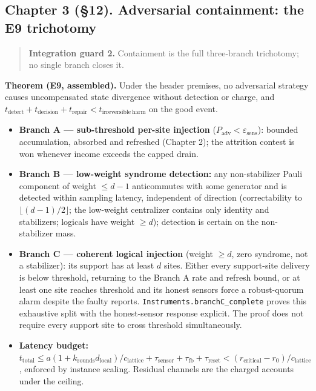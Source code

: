 \documentclass[
]{article}
\providecommand{\tightlist}{%
  \setlength{\itemsep}{0pt}\setlength{\parskip}{0pt}}
\begin{document}
\subsection{Chapter 3 (§12). Adversarial containment: the E9
trichotomy}\label{chapter-3-12.-adversarial-containment-the-e9-trichotomy}

\begin{quote}
\textbf{Integration guard 2.} Containment is the full three-branch
trichotomy; no single branch closes it.
\end{quote}

\textbf{Theorem (E9, assembled).} Under the header premises, no
adversarial strategy causes uncompensated state divergence without
detection or charge, and
\(t_{\mathrm{detect}}+t_{\mathrm{decision}}+t_{\mathrm{repair}}<t_{\mathrm{irreversible\ harm}}\)
on the good event.

\begin{itemize}
\tightlist
\item
  \textbf{Branch A --- sub-threshold per-site injection}
  (\(P_{\mathrm{adv}}<\varepsilon_{\mathrm{sens}}\)): bounded
  accumulation, absorbed and refreshed (Chapter 2); the attrition
  contest is won whenever income exceeds the capped drain.
\item
  \textbf{Branch B --- low-weight syndrome detection:} any
  non-stabilizer Pauli component of weight \(\le d-1\) anticommutes with
  some generator and is detected within sampling latency, independent of
  direction (correctability to \(\lfloor(d-1)/2\rfloor\); the low-weight
  centralizer contains only identity and stabilizers; logicals have
  weight \(\ge d\)); detection is certain on the non-stabilizer mass.
\item
  \textbf{Branch C --- coherent logical injection} (weight \(\ge d\),
  zero syndrome, not a stabilizer): its support has at least \(d\)
  sites. Either every support-site delivery is below threshold,
  returning to the Branch A rate and refresh bound, or at least one site
  reaches threshold and its honest sensors force a robust-quorum alarm
  despite the faulty reports.
  \texttt{I\allowbreak{}n\allowbreak{}s\allowbreak{}t\allowbreak{}r\allowbreak{}u\allowbreak{}m\allowbreak{}e\allowbreak{}n\allowbreak{}t\allowbreak{}s\allowbreak{}.\allowbreak{}b\allowbreak{}r\allowbreak{}a\allowbreak{}n\allowbreak{}c\allowbreak{}h\allowbreak{}C\allowbreak{}\_\allowbreak{}c\allowbreak{}o\allowbreak{}m\allowbreak{}p\allowbreak{}l\allowbreak{}e\allowbreak{}t\allowbreak{}e}
  proves this exhaustive split with the honest-sensor response explicit.
  The proof does not require every support site to cross threshold
  simultaneously.
\item
  \textbf{Latency budget:}
  \(t_{\mathrm{total}}\le a(1+k_{\mathrm{rounds}}d_{\mathrm{local}})/c_{\mathrm{lattice}}+\tau_{\mathrm{sensor}}+\tau_{\mathrm{fb}}+\tau_{\mathrm{reset}}<(r_{\mathrm{critical}}-r_0)/c_{\mathrm{lattice}}\),
  enforced by instance scaling. Residual channels are the charged
  accounts under the ceiling.
\end{itemize}
\end{document}
